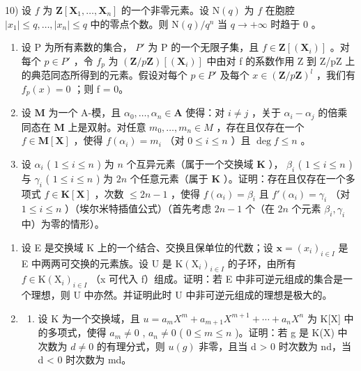 10) 设 \(f\) 为 \(\mathbf{Z}[\mathbf{X}_1, \ldots, \mathbf{X}_n]\) 的一个非零元素。设 \(\mathrm{N}(q)\) 为 \(f\) 在胞腔 \(|x_1| \leqslant q, \ldots, |x_n| \leqslant q\) 中的零点个数。则 \(\mathrm{N}(q) / q^n\) 当 \(q \to +\infty\) 时趋于 0 。

\begin{enumerate}
\def\labelenumi{\arabic{enumi})}
\setcounter{enumi}{10}
\item
  设 P 为所有素数的集合， \(P'\) 为 P 的一个无限子集，且 \(f \in \mathbf{Z}[(\mathbf{X}_i)]\) 。对每个 \(p \in P'\) ，令 \(f_p\) 为 \((\mathbf{Z}/p\mathbf{Z})[(\mathbf{X}_i)]\) 中由对 f 的系数作用 Z 到 Z/pZ 上的典范同态所得到的元素。假设对每个 \(p \in P'\) 及每个 \(x \in (\mathbf{Z}/p\mathbf{Z})^l\) ，我们有 \(f_p(x) = 0\) ；则 f = 0。
\item
  设 \(\mathbf{M}\) 为一个 A-模，且 \(\alpha_0, \ldots, \alpha_n \in \mathbf{A}\) 使得：对 \(i \neq j\) ，关于 \(\alpha_i - \alpha_j\) 的倍乘同态在 \(\mathbf{M}\) 上是双射。对任意 \(m_0, \ldots, m_n \in M\) ，存在且仅存在一个 \(f \in \mathbf{M}[\mathbf{X}]\) ，使得 \(f(\alpha_i) = m_i\) （对 \(0 \leqslant i \leqslant n\) ）且 \(\deg f \leqslant n\) 。
\item
  设 \(\alpha_{i}\) ( \(1 \leqslant i \leqslant n\) ) 为 \(n\) 个互异元素（属于一个交换域 \(\mathbf{K}\) ）， \(\beta_{i}\) ( \(1 \leqslant i \leqslant n\) ) 与 \(\gamma_{i}\) ( \(1 \leqslant i \leqslant n\) ) 为 \(2n\) 个任意元素（属于 \(\mathbf{K}\) ）。证明：存在且仅存在一个多项式 \(f \in \mathbf{K}[\mathbf{X}]\) ，次数 \(\leqslant 2n - 1\) ，使得 \(f(\alpha_{i}) = \beta_{i}\) 且 \(f'(\alpha_{i}) = \gamma_{i}\) （对 \(1 \leqslant i \leqslant n\) ）（埃尔米特插值公式）（首先考虑 \(2n - 1\) 个（在 \(2n\) 个元素 \(\beta_{i}, \gamma_{i}\) 中）为零的情形）。
\end{enumerate}

\BourbakiExerciseGroup

\begin{enumerate}
\def\labelenumi{\arabic{enumi})}
\item
  设 E 是交换域 K 上的一个结合、交换且保单位的代数；设 \(\mathbf{x} = (x_i)_{i \in I}\) 是 E 中两两可交换的元素族。设 U 是 \(\mathrm{K}(\mathrm{X}_i)_{i \in I}\) 的子环，由所有 \(f \in \mathrm{K}(\mathrm{X}_i)_{i \in I}\) （x 可代入 f）组成。证明：若 E 中非可逆元组成的集合是一个理想，则 U 中亦然。并证明此时 U 中非可逆元组成的理想是极大的。
\item
  \begin{enumerate}
  \def\labelenumii{\alph{enumii})}
  \tightlist
  \item
    设 K 为一个交换域，且 \(u = a_{m}X^{m} + a_{m+1}X^{m+1} + \cdots + a_{n}X^{n}\) 为 K{[}X{]} 中的多项式，使得 \(a_{m} \neq 0\) , \(a_{n} \neq 0\) ( \(0 \leq m \leq n\) )。证明：若 g 是 K(X) 中次数为 \(d \neq 0\) 的有理分式，则 \(u(g)\) 非零，且当 d \textgreater{} 0 时次数为 nd，当 d \textless{} 0 时次数为 md。
  \end{enumerate}
\end{enumerate}

